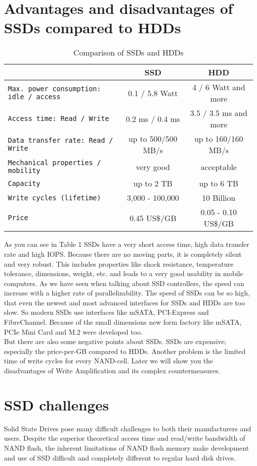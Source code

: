 \documentclass{acm_proc_article-sp}
\begin{document}
\section{Advantages and disadvantages of SSDs compared to HDDs}
\begin{table*}
\centering
\caption{Comparison of SSDs and HDDs}
\begin{tabular}{|l|c|c|} \hline
&SSD& HDD\\ \hline
\texttt{Max. power consumption: idle / access} & 0.1 / 5.8 Watt& 4 / 6 Watt and more\\ \hline
\texttt{Access time: Read / Write}& 0.2 ms / 0.4 ms& 3.5 / 3.5 ms and more\\ \hline
\texttt{Data transfer rate: Read / Write}& up to 500/500 MB/s & up to 160/160 MB/s\\ \hline
\texttt{Mechanical properties / mobility}& very good& acceptable\\ \hline
\texttt{Capacity}& up to 2 TB & up to 6 TB\\ \hline
\texttt{Write cycles (lifetime)}& 3,000 - 100,000 & 10 Billion\\ \hline
\texttt{Price}& 0.45 US\$/GB & 0.05 - 0.10 US\$/GB\\ \hline\end{tabular}

\end{table*}
As you can see in Table 1 SSDs have a very short access time, high data transfer rate and high IOPS. Because there are no moving parts, it is completely silent and very robust. This includes properties like shock resistance, temperature tolerance, dimensions, weight, etc. and leads to a very good usability in mobile computers. As we have seen when talking about SSD controllers, the speed can increase with a higher rate of parallelizability. The speed of SSDs can be so high, that even the newest and most advanced interfaces for SSDs and HDDs are too slow. So modern SSDs use interfaces like mSATA, PCI-Express and FibreChannel. Because of the small dimensions new form factory like mSATA, PCIe Mini Card and M.2 were developed too.
\\
But there are also some negative points about SSDs. SSDs are expensive; especially the price-per-GB compared to HDDs. Another problem is the limited time of write cycles for every NAND-cell. Later we will show you the disadvantages of Write Amplification and its complex countermeasures.

\section{SSD challenges}
Solid State Drives pose many difficult challenges to both their manufacturers and users. Despite the superior theoretical access time and read/write bandwidth of NAND flash, the inherent limitations of NAND flash memory make development and use of SSD difficult and completely different to regular hard disk drives.
\end{document}
